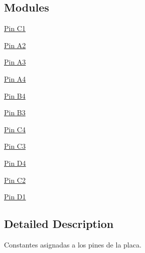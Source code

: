 \subsection*{Modules}
\begin{DoxyCompactItemize}
\item 
\hyperlink{group___p_i_n_c1}{Pin C1}
\item 
\hyperlink{group___p_i_n_a2}{Pin A2}
\item 
\hyperlink{group___p_i_n_a3}{Pin A3}
\item 
\hyperlink{group___p_i_n_a4}{Pin A4}
\item 
\hyperlink{group___p_i_n_b4}{Pin B4}
\item 
\hyperlink{group___p_i_n_b3}{Pin B3}
\item 
\hyperlink{group___p_i_n_c4}{Pin C4}
\item 
\hyperlink{group___p_i_n_c3}{Pin C3}
\item 
\hyperlink{group___p_i_n_d4}{Pin D4}
\item 
\hyperlink{group___p_i_n_c2}{Pin C2}
\item 
\hyperlink{group___p_i_n_d1}{Pin D1}
\end{DoxyCompactItemize}


\subsection{Detailed Description}
Constantes asignadas a los pines de la placa. 

